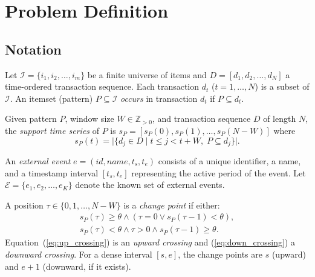 \section{Problem Definition}\label{sec:problem}

\subsection{Notation}

Let $\mathcal{I} = \{i_1, i_2, \ldots, i_m\}$ be a finite universe of items
and $D = [d_1, d_2, \ldots, d_N]$ a time-ordered transaction sequence.
Each transaction $d_t$ ($t = 1, \ldots, N$) is a subset of $\mathcal{I}$.
An itemset (pattern) $P \subseteq \mathcal{I}$ \emph{occurs} in transaction $d_t$
if $P \subseteq d_t$.

\begin{definition}\label{def:support_series}
Given pattern $P$, window size $W \in \mathbb{Z}_{>0}$,
and transaction sequence $D$ of length $N$,
the \emph{support time series} of $P$ is
$s_P = [s_P(0), s_P(1), \ldots, s_P(N-W)]$ where
\begin{equation}
s_P(t) = \bigl|\{d_j \in D \mid t \leq j < t + W,\; P \subseteq d_j\}\bigr|.
\label{eq:support_series}
\end{equation}
\end{definition}

\begin{definition}\label{def:event}
An \emph{external event} $e = (\textit{id}, \textit{name}, t_s, t_e)$ consists of
a unique identifier, a name, and a timestamp interval $[t_s, t_e]$
representing the active period of the event.
Let $\mathcal{E} = \{e_1, e_2, \ldots, e_K\}$ denote the known set of external events.
\end{definition}

\begin{definition}\label{def:change_point}
A position $\tau \in \{0, 1, \ldots, N-W\}$ is a \emph{change point} if either:
\begin{align}
s_P(\tau) \geq \theta \land (\tau = 0 \lor s_P(\tau-1) < \theta), \label{eq:up_crossing}\\
s_P(\tau) < \theta \land \tau > 0 \land s_P(\tau-1) \geq \theta. \label{eq:down_crossing}
\end{align}
Equation~(\ref{eq:up_crossing}) is an \emph{upward crossing} and
(\ref{eq:down_crossing}) a \emph{downward crossing}.
For a dense interval $[s, e]$, the change points are $s$ (upward) and $e+1$ (downward, if it exists).
\end{definition}

